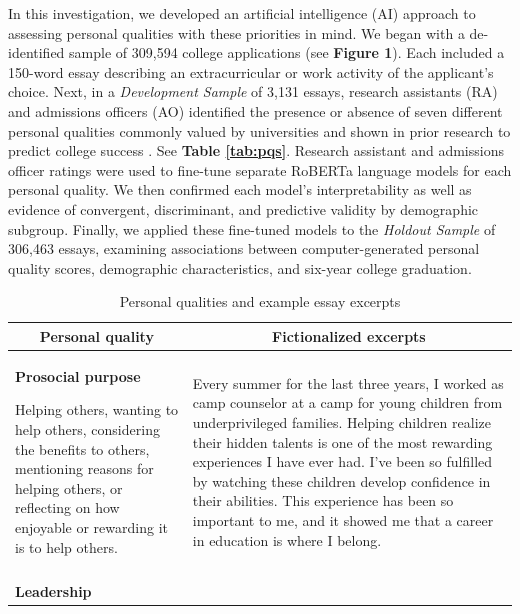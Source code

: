 \documentclass[11pt]{report}
\begin{document}
\begin{mainf}
In this investigation, we developed an artificial intelligence (AI) approach to assessing personal qualities with these priorities in mind. 
We began with a de-identified sample of 309,594 college applications (see \textbf{Figure 1}). Each included a 150-word essay describing an extracurricular or work activity of the applicant’s choice. Next, in a \textit{Development Sample} of 3,131 essays, research assistants (RA) and admissions officers (AO) identified the presence or absence of seven different personal qualities commonly valued by universities and shown in prior research to predict college success \cite{almlund_personality_2011}. See \textbf{Table \ref{tab:pqs}}. Research assistant and admissions officer ratings were used to fine-tune separate RoBERTa language models \cite{liu_roberta_2019} for each personal quality. We then confirmed each model’s interpretability as well as evidence of convergent, discriminant, and predictive validity by demographic subgroup. Finally, we applied these fine-tuned models to the \textit{Holdout Sample} of 306,463 essays, examining associations between computer-generated personal quality scores, demographic characteristics, and six-year college graduation.

\begin{table}
\small
\caption{Personal qualities and example essay excerpts}
\def\arraystretch{1}%
\begin{tabular}{  p{.275\linewidth}  p{.675\linewidth}}
\hline
\multicolumn{1}{c}{\textbf{Personal quality}} & \multicolumn{1}{c}{\textbf{Fictionalized excerpts}}\\                                                                      \hline
\textbf{Prosocial purpose}

Helping others, wanting to help others, considering the benefits to others, mentioning reasons for helping others, or reflecting on how enjoyable or rewarding it is to help others. & Every summer for the last three years, I worked as camp counselor at a camp for young children from underprivileged families. Helping children realize their hidden talents is one of the most rewarding experiences I have ever had. I’ve been so fulfilled by watching these children develop confidence in their abilities. This experience has been so important to me, and it showed me that a career in education is where I belong.                                         \\ \\
\textbf{Leadership}


\end{tabular}
\end{table}
\end{mainf}
\end{document}
